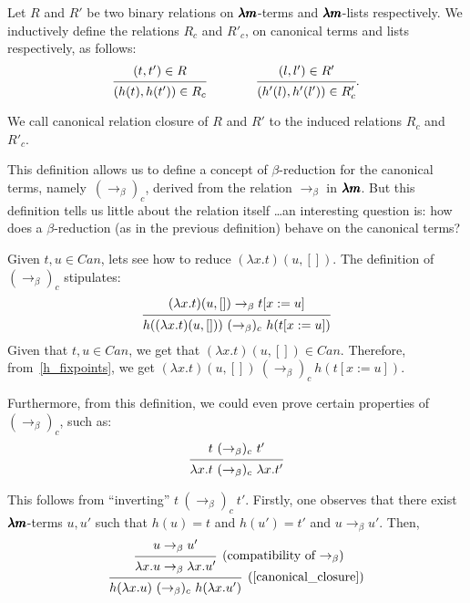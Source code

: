 \begin{definition}
  \label{canonical_closure}
  Let $R$ and $R'$ be two binary relations on $\pmb{\lambda m}$-terms and $\pmb{\lambda m}$-lists respectively.
  We inductively define the relations $R_c$ and $R'_c$, on canonical terms and lists respectively, as follows:
  \[
    \begin{prooftree}
      \hypo{ (t, t') \in R }
      \infer1{ (h(t), h(t')) \in R_c } 
    \end{prooftree}
    \qquad \qquad
    \begin{prooftree}
      \hypo{ (l, l') \in R' }
      \infer1{ (h'(l), h'(l')) \in R'_c } 
    \end{prooftree}.
  \]

  We call canonical relation closure of $R$ and $R'$ to the induced relations $R_c$ and $R'_c$.
\end{definition}

This definition allows us to define a concept of $\beta$-reduction for the canonical terms, namely~${(\to_\beta)}_c$, derived from the relation $\to_\beta$ in $\pmb{\lambda m}$.
But this definition tells us little about the relation itself \dots an interesting question is: how does a $\beta$-reduction (as in the previous definition) behave on the canonical terms?

Given $t, u \in Can$, lets see how to reduce $(\lambda x . t)(u, [])$.
The definition of $(\to_\beta)_c$ stipulates: 
\[ \begin{prooftree}
    \hypo{ (\lambda x.t)(u, []) \to_\beta t[x := u] }
    \infer1[]{ h((\lambda x.t)(u, [])) \ (\to_\beta)_c \ h(t[x := u]) }
  \end{prooftree} \]
Given that $t, u \in Can$, we get that $(\lambda x.t)(u, []) \in Can$.
Therefore, from~\cref{h_fixpoints}, we get $(\lambda x.t)(u, []) \ (\to_\beta)_c \ h(t[x := u])$.

Furthermore, from this definition, we could even prove certain properties of $(\to_\beta)_c$, such as:
\[ \begin{prooftree}
    \hypo{ t \ (\to_\beta)_c \ t' }
    \infer1{ \lambda x.t \ (\to_\beta)_c \ \lambda x.t' }.
  \end{prooftree} \]

This follows from ``inverting'' $t \ (\to_\beta)_c \ t'$.
Firstly, one observes that there exist $\pmb{\lambda m}$-terms $u, u'$ such that $h(u) = t$ and $h(u') = t'$ and $u \to_\beta u'$.
Then, 
\[ \begin{prooftree}
    \hypo{ u \to_\beta u' }
    \infer1[\text{(compatibility of $\to_\beta$)}]{ \lambda x.u \to_\beta \lambda x.u' }
    \infer1[\text{(\cref{canonical_closure})}]{ h(\lambda x.u) \ (\to_\beta)_c \ h(\lambda x.u') }
  \end{prooftree} \]

